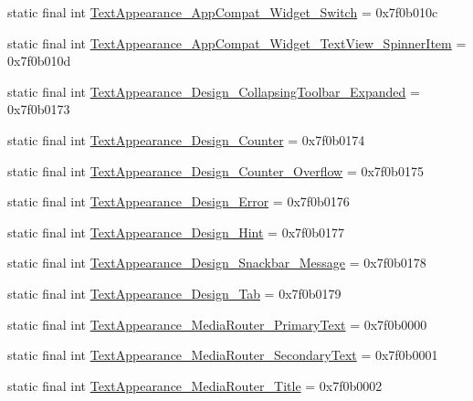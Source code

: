 \begin{CompactItemize}
static final int \hyperlink{classcom_1_1companyname_1_1x__2doo_1_1_r_1_1style_d5f56552dbe69bce006758b02220331c}{TextAppearance\_\-AppCompat\_\-Widget\_\-Switch} = 0x7f0b010c
\item 
static final int \hyperlink{classcom_1_1companyname_1_1x__2doo_1_1_r_1_1style_d79e82397f9a0b8fdb69c4bb6624f3be}{TextAppearance\_\-AppCompat\_\-Widget\_\-TextView\_\-SpinnerItem} = 0x7f0b010d
\item 
static final int \hyperlink{classcom_1_1companyname_1_1x__2doo_1_1_r_1_1style_82944e496df0c0f6e4e8e0179da84c3f}{TextAppearance\_\-Design\_\-CollapsingToolbar\_\-Expanded} = 0x7f0b0173
\item 
static final int \hyperlink{classcom_1_1companyname_1_1x__2doo_1_1_r_1_1style_449fbaf9aa8c4ff44e387b5f07389432}{TextAppearance\_\-Design\_\-Counter} = 0x7f0b0174
\item 
static final int \hyperlink{classcom_1_1companyname_1_1x__2doo_1_1_r_1_1style_27b5fe8a3e11a99527205411ed4d1094}{TextAppearance\_\-Design\_\-Counter\_\-Overflow} = 0x7f0b0175
\item 
static final int \hyperlink{classcom_1_1companyname_1_1x__2doo_1_1_r_1_1style_af8e5cb6c33a6d9110b93e888ec742a6}{TextAppearance\_\-Design\_\-Error} = 0x7f0b0176
\item 
static final int \hyperlink{classcom_1_1companyname_1_1x__2doo_1_1_r_1_1style_d336f540d391d85114f2802ff92f2fe2}{TextAppearance\_\-Design\_\-Hint} = 0x7f0b0177
\item 
static final int \hyperlink{classcom_1_1companyname_1_1x__2doo_1_1_r_1_1style_79968df2e31b4ccd89a88789984a5435}{TextAppearance\_\-Design\_\-Snackbar\_\-Message} = 0x7f0b0178
\item 
static final int \hyperlink{classcom_1_1companyname_1_1x__2doo_1_1_r_1_1style_31c76940894c7877bbdc2125bb10c950}{TextAppearance\_\-Design\_\-Tab} = 0x7f0b0179
\item 
static final int \hyperlink{classcom_1_1companyname_1_1x__2doo_1_1_r_1_1style_f6ad2c87530c916403f4958571018042}{TextAppearance\_\-MediaRouter\_\-PrimaryText} = 0x7f0b0000
\item 
static final int \hyperlink{classcom_1_1companyname_1_1x__2doo_1_1_r_1_1style_31192b827b345f39711cce583bc3c3eb}{TextAppearance\_\-MediaRouter\_\-SecondaryText} = 0x7f0b0001
\item 
static final int \hyperlink{classcom_1_1companyname_1_1x__2doo_1_1_r_1_1style_3121674394e501c5405adb67ff1c1dfd}{TextAppearance\_\-MediaRouter\_\-Title} = 0x7f0b0002
\item 

\end{CompactItemize}
